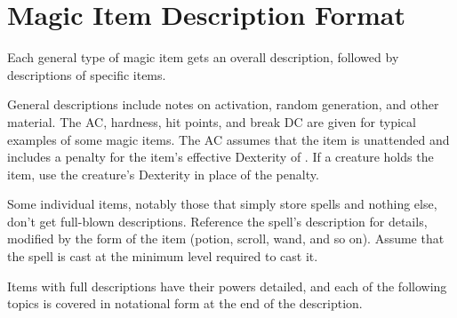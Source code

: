 \section{Magic Item Description Format}

Each general type of magic item gets an overall description, followed by descriptions of specific items.

General descriptions include notes on activation, random generation, and other material. The AC, hardness, hit points, and break DC are given for typical examples of some magic items. The AC assumes that the item is unattended and includes a  penalty for the item's effective Dexterity of . If a creature holds the item, use the creature's Dexterity in place of the  penalty.

Some individual items, notably those that simply store spells and nothing else, don't get full-blown descriptions. Reference the spell's description for details, modified by the form of the item (potion, scroll, wand, and so on). Assume that the spell is cast at the minimum level required to cast it.

Items with full descriptions have their powers detailed, and each of the following topics is covered in notational form at the end of the description.

